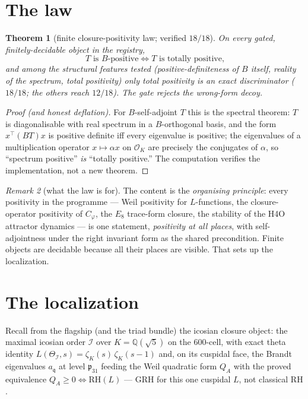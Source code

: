 \documentclass[11pt]{article}
\newtheorem{theorem}{Theorem}[section]
\theoremstyle{remark}
\newtheorem{remark}[theorem]{Remark}
\newcommand{\OO}{\mathcal{O}}
\newcommand{\II}{\mathcal{I}}
\newcommand{\KK}{K}
\newcommand{\RH}{\mathrm{RH}}
\begin{document}
\section{The law}\label{sec:law}

\begin{theorem}[finite closure-positivity law; verified $18/18$]\label{thm:law}
On every gated, finitely-decidable object in the registry,
\[
T \text{ is } B\text{-positive} \iff T \text{ is totally positive,}
\]
and among the structural features tested (positive-definiteness of $B$ itself,
reality of the spectrum, total positivity) \emph{only} total positivity is an exact
discriminator ($18/18$; the others reach $12/18$). The gate rejects the wrong-form
decoy. \end{theorem}

\begin{proof}[Proof (and honest deflation)]
For $B$-self-adjoint $T$ this is the spectral theorem: $T$ is diagonalisable with
real spectrum in a $B$-orthogonal basis, and the form $x^{\top}(BT)x$ is positive
definite iff every eigenvalue is positive; the eigenvalues of a multiplication
operator $x \mapsto \alpha x$ on $\OO_\KK$ are precisely the conjugates of $\alpha$,
so ``spectrum positive'' \emph{is} ``totally positive.'' The computation verifies the
implementation, not a new theorem.
\end{proof}

\begin{remark}[what the law is for]\label{rem:value}
The content is the \emph{organising principle}: every positivity in the programme ---
Weil positivity for $L$-functions, the closure-operator positivity of $C_\varphi$,
the $E_8$ trace-form closure, the stability of the H4O attractor dynamics --- is one
statement, \emph{positivity at all places}, with self-adjointness under the right
invariant form as the shared precondition. Finite objects are decidable because all
their places are visible. That sets up the localization.
\end{remark}

\section{The localization}\label{sec:local}

Recall from the flagship (and the triad bundle) the icosian closure object: the
maximal icosian order $\II$ over $\KK=\mathbb{Q}(\sqrt5)$ on the $600$-cell, with
exact theta identity $L(\Theta_\II,s) = \zeta_\KK(s)\,\zeta_\KK(s-1)$ and, on its
cuspidal face, the Brandt eigenvalues $a_\mathfrak{q}$ at level
$\mathfrak{p}_{31}$ feeding the Weil quadratic form $Q_A$ with the proved equivalence
$Q_A \ge 0 \iff \RH(L)$ --- GRH for this one cuspidal $L$, not classical $\RH$.
\end{document}
